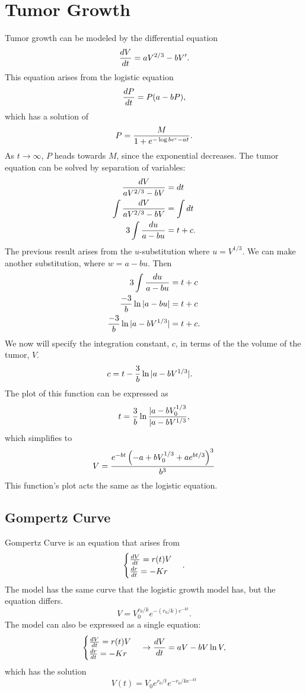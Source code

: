 \documentclass{hw}
\begin{document}
\section{Tumor Growth}
Tumor growth can be modeled by the differential equation
\[
{dV\over dt} = aV^{2/3}-bV'.
\]
This equation arises from the logistic equation
\[
{dP\over dt} = P(a-bP),
\]
which has a solution of
\[
P={M\over 1+e^{-\log{be^c}-at}}.
\]
As $t\to\infty$, $P$ heads towards $M$, since the exponential decreases. The tumor equation can be solved
by separation of variables:
\begin{align*}
{dV\over aV^{2/3}-bV}&=dt\\
\int{dV\over aV^{2/3}-bV}&=\int dt\\
3\int{du\over a-bu}&=t+c.
\end{align*}
The previous result arises from the $u$-substitution where $u=V^{1/3}$. We can make another substitution,
where $w=a-bu$. Then
\begin{align*}
3\int{du\over a-bu}&=t+c\\
{-3\over b}\ln{|a-bu|}&=t+c\\
{-3\over b}\ln{|a-bV^{1/3}|}&=t+c.
\end{align*}
We now will specify the integration constant, $c$, in terms of the the volume of the tumor, $V$.
\begin{align*}
c &= t - {3\over b}\ln{|a-bV^{1/3}|}.
\end{align*}
The plot of this function can be expressed as
\[
t = {3\over b}\ln{|a-bV_{0}^{1/3}\over|a-bV^{1/3}},
\]
which simplifies to
\[
V = {e^{-bt}\left(-a+bV_{0}^{1/3}+ae^{bt/3}\right)^{3}\over b^{3}}
\]
This function's plot acts the same as the logistic equation.
\subsection{Gompertz Curve}
Gompertz Curve is an equation that arises from
\[
\begin{cases}
{dV\over dt}=r(t)V\\
{dr\over dt}=-Kr
\end{cases}.
\]
The model has the same curve that the logistic growth model has, but the equation differs.
\[
V=V_{0}^{r_{0}/k}e^{-(r_{0}/k)e^{-kt}}.
\]
The model can also be expressed as a single equation:
\[
\begin{cases}
{dV\over dt}=r(t)V\\
{dr\over dt}=-Kr
\end{cases}
\to
{dV\over dt} = aV-bV\ln{V},
\]
which has the solution
\[
V(t)=V_{0}e^{r_{0}/t}e^{-r_{0}/ke^{-kt}}
\]
\end{document}

